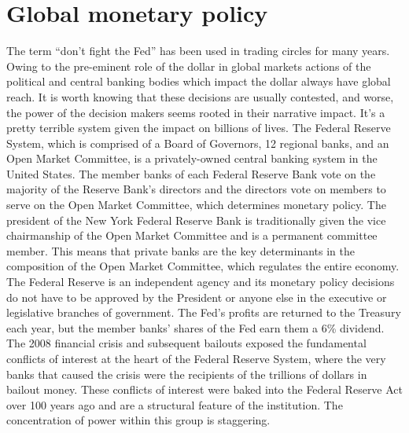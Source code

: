 \section{Global monetary policy}
The term ``don't fight the Fed'' has been used in trading circles for many years. Owing to the pre-eminent role of the dollar in global markets actions of the political and central banking bodies which impact the dollar always have global reach. It is worth knowing that these decisions are usually contested, and worse, the power of the decision makers seems rooted in their narrative impact. It's a pretty terrible system given the impact on billions of lives. The Federal Reserve System, which is comprised of a Board of Governors, 12 regional banks, and an Open Market Committee, is a privately-owned central banking system in the United States. The member banks of each Federal Reserve Bank vote on the majority of the Reserve Bank's directors and the directors vote on members to serve on the Open Market Committee, which determines monetary policy. The president of the New York Federal Reserve Bank is traditionally given the vice chairmanship of the Open Market Committee and is a permanent committee member. This means that private banks are the key determinants in the composition of the Open Market Committee, which regulates the entire economy. The Federal Reserve is an independent agency and its monetary policy decisions do not have to be approved by the President or anyone else in the executive or legislative branches of government. The Fed's profits are returned to the Treasury each year, but the member banks' shares of the Fed earn them a 6\% dividend. The 2008 financial crisis and subsequent bailouts exposed the fundamental conflicts of interest at the heart of the Federal Reserve System, where the very banks that caused the crisis were the recipients of the trillions of dollars in bailout money. These conflicts of interest were baked into the Federal Reserve Act over 100 years ago and are a structural feature of the institution. The concentration of power within this group is staggering. 
